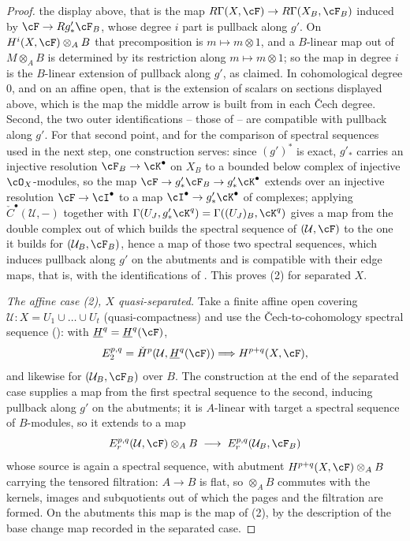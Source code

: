 \begin{proof}
the display above, that is the map
$R\Gamma(X,\cF)\to R\Gamma(X_B,\cF_B)$ induced by
$\cF\to Rg'_*\cF_B$, whose degree $i$ part is pullback along $g'$.  On
$H^i(X,\cF)\otimes_AB$ that precomposition is $m\mapsto m\otimes1$,
and a $B$-linear map out of $M\otimes_AB$ is determined by its
restriction along $m\mapsto m\otimes1$; so the map in degree $i$ is the
$B$-linear extension of pullback along $g'$, as claimed.  In
cohomological degree $0$, and on an affine open,
that is the extension of scalars on sections displayed above, which is
the map the middle arrow is built from in each Čech degree.  Second,
the two outer identifications -- those of 
-- are compatible with pullback along $g'$.
For that second point, and for the comparison of spectral sequences
used in the next step, one construction serves: since $(g')^*$ is
exact, $g'_*$ carries an injective resolution $\cF_B\to\cK^\bullet$ on
$X_B$ to a bounded below complex of injective $\cO_X$-modules, so the
map $\cF\to g'_*\cF_B\to g'_*\cK^\bullet$ extends over an injective
resolution $\cF\to\cI^\bullet$ to a map $\cI^\bullet\to
g'_*\cK^\bullet$ of complexes; applying
$\check C^\bullet(\mathcal U,-)$ together with
$\Gamma(U_J,g'_*\cK^q)=\Gamma((U_J)_B,\cK^q)$ gives a map from the
double complex out of which  builds the
spectral sequence of $(\mathcal U,\cF)$ to the one it builds for
$(\mathcal U_B,\cF_B)$, hence a map of those two spectral sequences,
which induces pullback along $g'$ on the abutments and is compatible
with their edge maps, that is, with the identifications of
.  This proves (2) for separated $X$.

\emph{The affine case (2), $X$ quasi-separated.}  Take a finite affine
open covering $\mathcal U:X=U_1\cup\dots\cup U_t$ (quasi-compactness)
and use the Čech-to-cohomology spectral sequence
(): with
$\underline H^q=\underline H^q(\cF)$,
\[
E_2^{p,q}=\check H^p(\mathcal U,\underline H^q(\cF))
\Longrightarrow H^{p+q}(X,\cF),
\]
and likewise for $(\mathcal U_B,\cF_B)$ over $B$.  The construction at
the end of the separated case supplies a map from the first spectral
sequence to the second, inducing pullback along $g'$ on the abutments;
it is $A$-linear with target a spectral sequence of $B$-modules, so it
extends to a map
\[
E_r^{p,q}(\mathcal U,\cF)\otimes_AB\;\longrightarrow\;
E_r^{p,q}(\mathcal U_B,\cF_B)
\]
whose source is again a spectral sequence, with abutment
$H^{p+q}(X,\cF)\otimes_AB$ carrying the tensored filtration: $A\to B$
is flat, so $\otimes_AB$ commutes with the kernels, images and
subquotients out of which the pages and the filtration are formed.  On
the abutments this map is the map of (2), by the description of the
base change map recorded in the separated case.


\end{proof}
